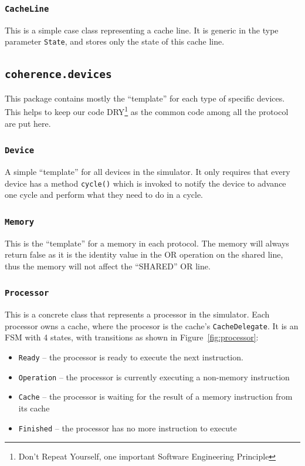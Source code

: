 \documentclass[nonacm,acmsmall,screen,11pt]{acmart}
\begin{document}
\subsubsection{\texttt{CacheLine}}
This is a simple case class representing a cache line.
It is generic in the type parameter \texttt{State}, and stores only the state of this cache line.

\subsection{\texttt{coherence.devices}}
This package contains mostly the ``template'' for each type of specific devices.
This helps to keep our code DRY\footnote{Don't Repeat Yourself, one important Software Engineering Principle} as the common code among all the protocol are put here.

\subsubsection{\texttt{Device}}
A simple ``template'' for all devices in the simulator.
It only requires that every device has a method \texttt{cycle()} which is invoked to notify the device to advance one cycle and perform what they need to do in a cycle.

\subsubsection{\texttt{Memory}}
This is the ``template'' for a memory in each protocol.
The memory will always return false as it is the identity value in the OR operation on the shared line, thus the memory will not affect the ``SHARED'' OR line.

\subsubsection{\texttt{Processor}}
This is a concrete class that represents a processor in the simulator.
Each processor owns a cache, where the procesor is the cache's \texttt{CacheDelegate}.
It is an FSM with 4 states, with transitions as shown in Figure~\ref{fig:processor}:
\begin{itemize}
  \item \texttt{Ready} -- the processor is ready to execute the next instruction.
  \item \texttt{Operation} -- the processor is currently executing a non-memory instruction
  \item \texttt{Cache} -- the processor is waiting for the result of a memory instruction from its cache
  \item \texttt{Finished} -- the processor has no more instruction to execute
\end{itemize}
\end{document}
